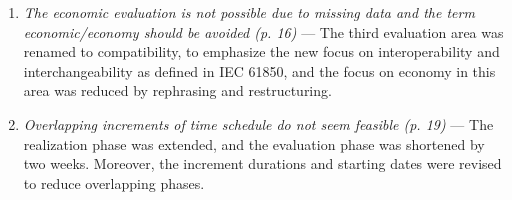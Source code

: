 \begin{enumerate}[label=R\arabic*.]
\begin{enumerate}[label=Q\arabic*.]
        \item \textit{The economic evaluation is not possible due to missing data and the term economic/economy should be avoided (p. 16)} --- The third evaluation area was renamed to compatibility, to emphasize the new focus on interoperability and interchangeability as defined in IEC 61850, and the focus on economy in this area was reduced by rephrasing and restructuring.
        \item \textit{Overlapping increments of time schedule do not seem feasible (p. 19)} --- The realization phase was extended, and the evaluation phase was shortened by two weeks. Moreover, the increment durations and starting dates were revised to reduce overlapping phases.
    \end{enumerate}
\end{enumerate}
